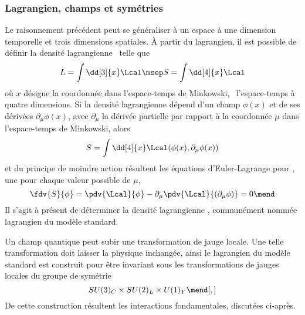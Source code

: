 \subsubsection{Lagrangien, champs et symétries}\label{chapter-MS-MSSM-section-formalisme-subsec-into_lagrangien-subsubsec-lagrangien_champs_symetries}
Le raisonnement précédent peut se généraliser à un espace à une dimension temporelle et trois dimensions spatiales.
À partir du lagrangien, il est possible de définir la densité lagrangienne \Lcal\ telle que
\begin{equation}
L = \int\dd[3]{x}\Lcal
\msep
S = \int\dd[4]{x}\Lcal
\end{equation}
où $x$ désigne la coordonnée dans l'espace-temps de Minkowski, \ie\ l'espace-temps à quatre dimensions.
Si la densité lagrangienne dépend d'un champ $\phi(x)$ et de ses dérivées $\partial_\mu\phi(x)$,
avec $\partial_\mu$ la dérivée partielle par rapport à la coordonnée $\mu$ dans l'espace-temps de Minkowski,
alors
\begin{equation}
S = \int\dd[4]{x}\Lcal(\phi(x),\partial_\mu\phi(x))
\end{equation}
et du principe de moindre action résultent les équations d'Euler-Lagrange pour \Lcal,
une pour chaque valeur possible de $\mu$,
\begin{equation}
\fdv{S}{\phi}
=
\pdv{\Lcal}{\phi} - \partial_\mu\pdv{\Lcal}{(\partial_\mu\phi)} = 0
\mend
\end{equation}
Il s'agit à présent de déterminer la densité lagrangienne \Lcal, communément nommée lagrangien du modèle standard.
\par Un champ quantique peut subir une transformation de jauge locale. Une telle transformation doit laisser la physique inchangée, ainsi le lagrangien du modèle standard est construit pour être invariant sous les transformations de jauges locales du groupe de symétrie
\begin{equation}
SU(3)_C \times SU(2)_L \times U(1)_Y
\mend[,]
\label{eq-symmetries_lagrangien_SM}
\end{equation}
De cette construction résultent les interactions fondamentales, discutées ci-après.






